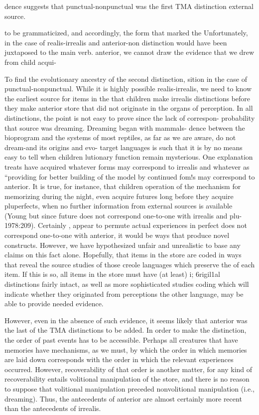 dence suggests that punctual-nonpunctual was the first TMA distinction external source.

to be grammaticized, and accordingly, the form that marked the Unfortunately, in the case of realis-irrealis and anterior-non distinction would have been juxtaposed to the main verb. anterior, we cannot draw the evidence that we drew from child acqui{}-

To find the evolutionary ancestry of the second distinction, sition in the case of punctual-nonpunctual. While it is highly possible realis-irrealis, we need to know the earliest source for items in the that children make irrealis distinctions before they make anterior  store that did not originate in the organs of perception. In all distinctions, the point is not easy to prove since the lack of correspon- probability that source was dreaming. Dreaming began with mammals- dence between the bioprogram  and the systems of most reptiles, as far as we are aware, do not dream-and its origins and evo- target languages is such that it is by no means easy to tell when children lutionary function remain mysterious. One explanation treats  have acquired whatever forms may correspond to irrealis and whatever as ``providing for better building of the  model by continued fom!s may correspond to anterior. It is true, for instance, that children operation of the mechanism for memorizing during the night, even   acquire futures long before they acquire pluperfects, when no further information from external sources is available (Young but since future does not correspond one-to-one with irrealis and plu- 1978:209). Certainly ,  appear to permute actual experiences in perfect does not correspond one-to-one with anterior, it would be
ways that produce novel constructs. However, we have hypothesized unfair and unrealistic to base any claims on this fact alone. Hopefully, that items in the  store are coded in ways that reveal the source studies of  those creole languages which preserve the
of each item. If this is so, all items in the store must have (at least) i; 6rigil1al distinctions fairly intact, as well as more sophisticated studies
coding which will indicate whether they originated from perceptions the  other  language, may be able to provide  needed evidence.


However, even in the absence of such evidence, it seems likely that anterior was the last of the TMA distinctions to be added. In order to make the distinction, the order of past events has to be accessible. Perhaps all creatures that have memories have mechanisms, as we must, by which the order in which memories are laid down corresponds with the order in which the relevant experiences occurred. However, recover\-ability of that order is another matter, for any kind of recoverability entails volitional manipulation of the  store, and there is no reason to suppose that volitional manipulation preceded nonvolitional manipulation (i.e., dreaming). Thus, the antecedents of anterior are almost certainly more recent than the antecedents of irrealis.

